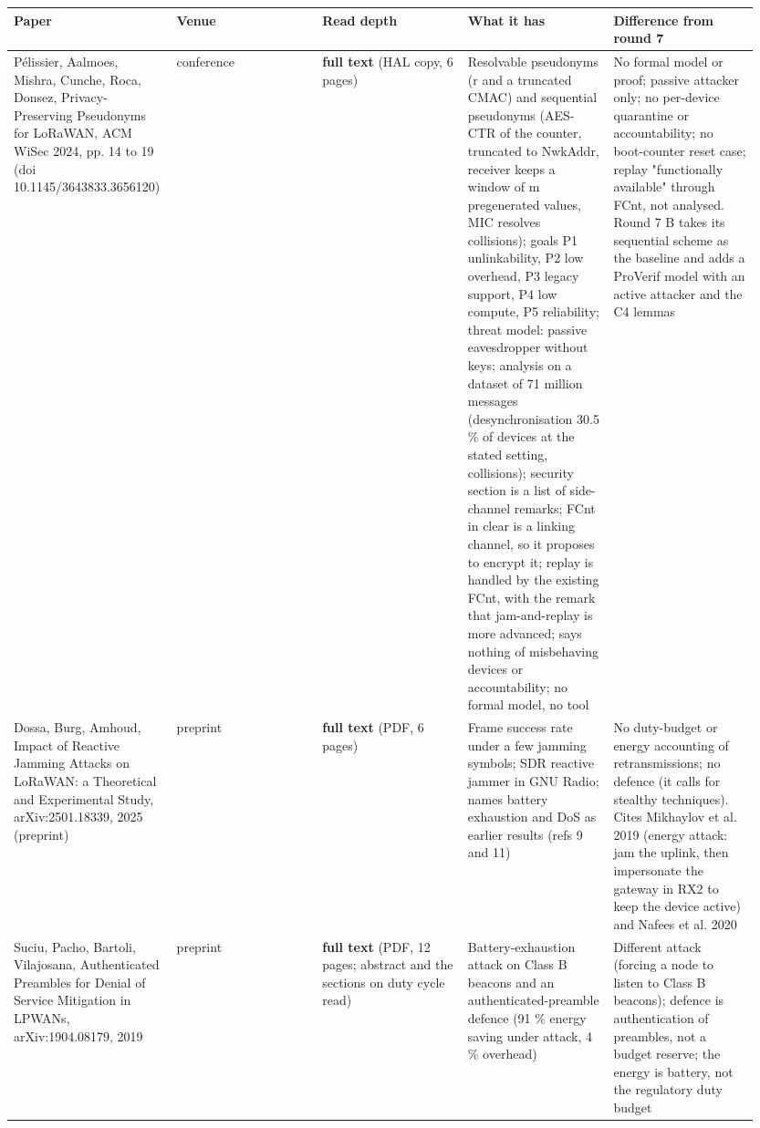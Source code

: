 {\scriptsize\raggedright
\begin{longtable}{p{0.190\linewidth}p{0.190\linewidth}p{0.190\linewidth}p{0.190\linewidth}p{0.190\linewidth}}
\toprule
Paper & Venue & Read depth & What it has & Difference from round 7 \\
\midrule
\endhead
P\'elissier, Aalmoes, Mishra, Cunche, Roca, Donsez, Privacy-Preserving Pseudonyms for LoRaWAN, ACM WiSec 2024, pp. 14 to 19 (doi 10.1145/3643833.3656120) & conference & \textbf{full text} (HAL copy, 6 pages) & Resolvable pseudonyms (r and a truncated CMAC) and sequential pseudonyms (AES-CTR of the counter, truncated to NwkAddr, receiver keeps a window of m pregenerated values, MIC resolves collisions); goals P1 unlinkability, P2 low overhead, P3 legacy support, P4 low compute, P5 reliability; threat model: passive eavesdropper without keys; analysis on a dataset of 71 million messages (desynchronisation 30.5 \% of devices at the stated setting, collisions); security section is a list of side-channel remarks; FCnt in clear is a linking channel, so it proposes to encrypt it; replay is handled by the existing FCnt, with the remark that jam-and-replay is more advanced; says nothing of misbehaving devices or accountability; no formal model, no tool & No formal model or proof; passive attacker only; no per-device quarantine or accountability; no boot-counter reset case; replay "functionally available" through FCnt, not analysed. Round 7 B takes its sequential scheme as the baseline and adds a ProVerif model with an active attacker and the C4 lemmas \\
Dossa, Burg, Amhoud, Impact of Reactive Jamming Attacks on LoRaWAN: a Theoretical and Experimental Study, arXiv:2501.18339, 2025 (preprint) & preprint & \textbf{full text} (PDF, 6 pages) & Frame success rate under a few jamming symbols; SDR reactive jammer in GNU Radio; names battery exhaustion and DoS as earlier results (refs 9 and 11) & No duty-budget or energy accounting of retransmissions; no defence (it calls for stealthy techniques). Cites Mikhaylov et al. 2019 (energy attack: jam the uplink, then impersonate the gateway in RX2 to keep the device active) and Nafees et al. 2020 \\
Suciu, Pacho, Bartoli, Vilajosana, Authenticated Preambles for Denial of Service Mitigation in LPWANs, arXiv:1904.08179, 2019 & preprint & \textbf{full text} (PDF, 12 pages; abstract and the sections on duty cycle read) & Battery-exhaustion attack on Class B beacons and an authenticated-preamble defence (91 \% energy saving under attack, 4 \% overhead) & Different attack (forcing a node to listen to Class B beacons); defence is authentication of preambles, not a budget reserve; the energy is battery, not the regulatory duty budget \\

\end{longtable}}
